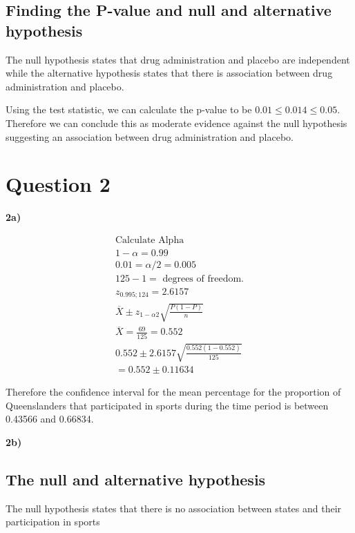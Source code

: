 \documentclass[oneside, a4paper]{article}
\begin{document}
\subsection{Finding the P-value and null and alternative hypothesis}
The null hypothesis states that drug administration and placebo are independent while the alternative hypothesis states that there is association between drug administration and placebo.

Using the test statistic, we can calculate the p-value to be $0.01 \leq 0.014 \leq 0.05$. Therefore we can conclude this as moderate evidence against the null hypothesis suggesting an association between drug administration and placebo.


\newpage

\section{Question 2}
\textbf{2a)}

\begin{equation*}
    \begin{split}
        \text{Calculate Alpha} \\
        1 - \alpha = 0.99 \\
        0.01 = \alpha / 2 = 0.005 \\
        125 - 1 = \text{ degrees of freedom.} \\
        z_{0.995;124} =  2.6157 \\
        \overline{X} \pm z_{1-\alpha2}\sqrt{\frac{P(1-P)}{n}}  \\
        \overline{X} = \frac{69}{125} = 0.552 \\
        0.552 \pm 2.6157 \sqrt{\frac{0.552(1-0.552)}{125}} \\
        = 0.552 \pm 0.11634
    \end{split}
\end{equation*}

Therefore the confidence interval for the mean percentage for the proportion of Queenslanders that participated in sports during the time period is between 0.43566 and 0.66834.

\textbf{2b)}

\subsection{The null and alternative hypothesis}

The null hypothesis states that there is no association between states and their participation in sports
\end{document}
